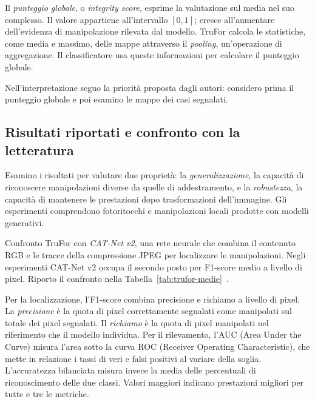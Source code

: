 Il \emph{punteggio globale}, o \emph{integrity score}, esprime la valutazione sul media nel suo complesso. Il valore appartiene all'intervallo $[0,1]$; cresce all'aumentare dell'evidenza di manipolazione rilevata dal modello. TruFor calcola le statistiche, come media e massimo, delle mappe attraverso il \emph{pooling}, un'operazione di aggregazione. Il classificatore usa queste informazioni per calcolare il punteggio globale.

Nell'interpretazione seguo la priorità proposta dagli autori: considero prima il punteggio globale e poi esamino le mappe dei casi segnalati.

\subsection{Risultati riportati e confronto con la letteratura}
\label{subsec:background-trufor-risultati}

Esamino i risultati per valutare due proprietà: la \emph{generalizzazione}, la capacità di riconoscere manipolazioni diverse da quelle di addestramento, e la \emph{robustezza}, la capacità di mantenere le prestazioni dopo trasformazioni dell'immagine. Gli esperimenti comprendono fotoritocchi e manipolazioni locali prodotte con modelli generativi.

Confronto TruFor con \emph{CAT-Net v2}, una rete neurale che combina il contenuto RGB e le tracce della compressione JPEG per localizzare le manipolazioni. Negli esperimenti CAT-Net v2 occupa il secondo posto per F1-score medio a livello di pixel. Riporto il confronto nella Tabella~\ref{tab:trufor-medie}~\cite{Guillaro_2023_CVPR}.

Per la localizzazione, l'F1-score combina precisione e richiamo a livello di pixel. La \emph{precisione} è la quota di pixel correttamente segnalati come manipolati sul totale dei pixel segnalati. Il \emph{richiamo} è la quota di pixel manipolati nel riferimento che il modello individua. Per il rilevamento, l'AUC (Area Under the Curve) misura l'area sotto la curva ROC (Receiver Operating Characteristic), che mette in relazione i tassi di veri e falsi positivi al variare della soglia. L'accuratezza bilanciata misura invece la media delle percentuali di riconoscimento delle due classi. Valori maggiori indicano prestazioni migliori per tutte e tre le metriche.

